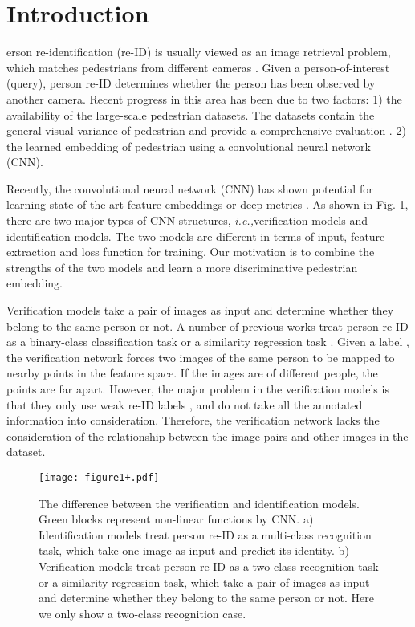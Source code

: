 \documentclass[journal]{IEEEtran}
\newcommand{\ie}{\mbox{\emph{i.e.,}}}
\begin{document}
\IEEEpeerreviewmaketitle



\section{Introduction}


erson re-identification (re-ID) is usually viewed as an image retrieval problem, which matches pedestrians from different cameras \cite{zheng2016survey}. Given a person-of-interest (query), person re-ID determines whether the person has been observed by another camera. Recent progress in this area has been due to two factors: 1) the availability of the large-scale pedestrian datasets. The datasets contain the general visual variance of pedestrian and provide a comprehensive evaluation \cite{li2014deepreid,zheng2015scalable}. 2) the learned embedding of pedestrian using a convolutional neural network (CNN).


Recently, the convolutional neural network (CNN) has shown potential for learning state-of-the-art feature embeddings or deep metrics \cite{li2014deepreid,yi2014deep,wu2016personnet,varior2016gated,xiao2016learning,zheng2016person,xiao2016end}. As shown in Fig. \ref{fig:1}, there are two major types of CNN structures, \ie verification models and identification models. The two models are different in terms of input, feature extraction and loss function for training. Our motivation is to combine the strengths of the two models and learn a more discriminative pedestrian embedding.
 
Verification models take a pair of images as input and determine whether they belong to the same person or not. A number of previous works treat person re-ID as a binary-class classification task or a similarity regression task \cite{li2014deepreid,yi2014deep,wu2016personnet,varior2016gated}. Given a label , the verification network forces two images of the same person to be mapped to nearby points in the feature space. If the images are of different people, the points are far apart. However, the major problem in the verification models is that they only use weak re-ID labels \cite{zheng2016survey}, and do not take all the annotated information into consideration. Therefore, the verification network lacks the consideration of the relationship between the image pairs and other images in the dataset. 

\begin{figure}[t]
\begin{center}
\texttt{[image: figure1+.pdf]}
\end{center}
   \caption{ The difference between the verification and identification models. Green blocks represent non-linear functions by CNN.
   a) Identification models treat person re-ID as a multi-class recognition task, which take one image as input and predict its identity.
   b) Verification models treat person re-ID as a two-class recognition task or a similarity regression task, which take a pair of images as input and determine whether they belong to the same person or not. Here we only show a two-class recognition case.}
\label{fig:1}
\end{figure}
\end{document}
